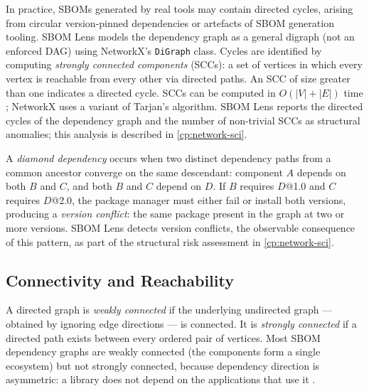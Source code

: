 In practice, SBOMs generated by real tools may contain directed cycles, arising from circular version-pinned dependencies or artefacts of SBOM generation tooling. SBOM Lens models the dependency graph as a general digraph (not an enforced DAG) using NetworkX's \texttt{DiGraph} class. Cycles are identified by computing \textit{strongly connected components} (SCCs): a set of vertices in which every vertex is reachable from every other via directed paths. An SCC of size greater than one indicates a directed cycle. SCCs can be computed in \(O(|V| + |E|)\) time \citep{CLRS4th}; NetworkX uses a variant of Tarjan's algorithm. SBOM Lens reports the directed cycles of the dependency graph and the number of non-trivial SCCs as structural anomalies; this analysis is described in \autoref{cp:network-sci}.

A \textit{diamond dependency} occurs when two distinct dependency paths from a common ancestor converge on the same descendant: component \(A\) depends on both \(B\) and \(C\), and both \(B\) and \(C\) depend on \(D\). If \(B\) requires \(D\)@1.0 and \(C\) requires \(D\)@2.0, the package manager must either fail or install both versions, producing a \textit{version conflict}: the same package present in the graph at two or more versions. SBOM Lens detects version conflicts, the observable consequence of this pattern, as part of the structural risk assessment in \autoref{cp:network-sci}.


\subsection{Connectivity and Reachability}
\label{sec:connectivity}

A directed graph is \textit{weakly connected} if the underlying undirected graph --- obtained by ignoring edge directions --- is connected. It is \textit{strongly connected} if a directed path exists between every ordered pair of vertices. Most SBOM dependency graphs are weakly connected (the components form a single ecosystem) but not strongly connected, because dependency direction is asymmetric: a library does not depend on the applications that use it \citep{CLRS4th}.

